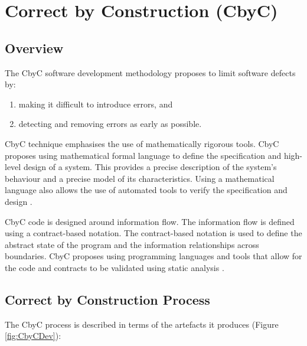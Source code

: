 
\chapter{Correct by Construction (CbyC) } %

\label{Chapter_CbyC} %

\section{Overview}

The CbyC software development methodology proposes to limit software 
defects by:  
\begin{enumerate}
	\item making it difficult to introduce errors, and
	\item detecting and removing errors as early as possible.
\end{enumerate}

CbyC technique emphasises the use of mathematically rigorous tools. CbyC proposes
using mathematical formal language to define the specification and high-level design
of a system. This provides a precise description of the system's behaviour and a
precise model of its characteristics. Using a mathematical language also allows
the use of automated tools to verify the specification and design \parencite{CbyCMan}.

CbyC code is designed around information flow. The information flow is
defined using a contract-based notation. The contract-based notation is
used to define the abstract state of the program and the information relationships
across boundaries. CbyC proposes using programming languages and tools that allow
for the code and contracts to be validated using static analysis \parencite{CbyCMan}.
 

\section{Correct by Construction Process}\label{CbyCDevWorkflow}

The CbyC process is described in terms of the artefacts it produces (Figure \ref{fig:CbyCDev}): 

